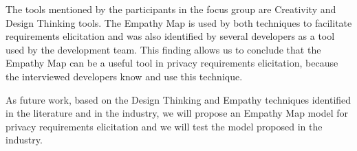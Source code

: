 \documentclass[conference]{IEEEtran}
\begin{document}

The tools mentioned by the participants in the focus group are Creativity and Design Thinking tools. The Empathy Map is used by both techniques to facilitate requirements elicitation and was also identified by several developers as a tool used by the development team. This finding allows us to conclude that the Empathy Map can be a useful tool in privacy requirements elicitation, because the interviewed developers know and use this technique.


As future work, based on the Design Thinking and Empathy techniques identified in the literature and in the industry, we will propose an Empathy Map model for privacy requirements elicitation and we will test the model proposed in the industry.




\end{document}
